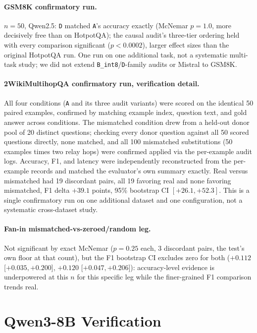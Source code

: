 \documentclass[11pt]{article}
\begin{document}
\paragraph{GSM8K confirmatory run.} $n=50$, Qwen2.5: \texttt{D} matched
\texttt{A}'s accuracy exactly (McNemar $p=1.0$, more decisively free
than on HotpotQA); the causal audit's three-tier ordering held with
every comparison significant ($p<0.0002$), larger effect sizes than the
original HotpotQA run. One run on one additional task, not a systematic
multi-task study; we did not extend \texttt{B\_int8}/\texttt{D}-family
audits or Mistral to GSM8K.

\paragraph{2WikiMultihopQA confirmatory run, verification detail.}
\label{app:2wiki}
All four conditions (\texttt{A} and its three audit variants) were
scored on the identical 50 paired examples, confirmed by matching
example index, question text, and gold answer across conditions. The
mismatched condition drew from a held-out donor pool of 20 distinct
questions; checking every donor question against all 50 scored
questions directly, none matched, and all 100 mismatched substitutions
(50 examples times two relay hops) were confirmed applied via the
per-example audit logs. Accuracy, F1, and latency were independently
reconstructed from the per-example records and matched the evaluator's
own summary exactly. Real versus mismatched had 19 discordant pairs,
all 19 favoring real and none favoring mismatched, F1 delta $+39.1$
points, 95\% bootstrap CI $[+26.1, +52.3]$. This is a single
confirmatory run on one additional dataset and one configuration, not a
systematic cross-dataset study.

\paragraph{Fan-in mismatched-vs-zeroed/random leg.} Not significant by
exact McNemar ($p=0.25$ each, 3 discordant pairs, the test's own floor
at that count), but the F1 bootstrap CI excludes zero for both
($+0.112$ [$+0.035,+0.200$], $+0.120$ [$+0.047,+0.206$]):
accuracy-level evidence is underpowered at this $n$ for this specific
leg while the finer-grained F1 comparison trends real.

\section{Qwen3-8B Verification}
\label{app:qwen3}
\end{document}
